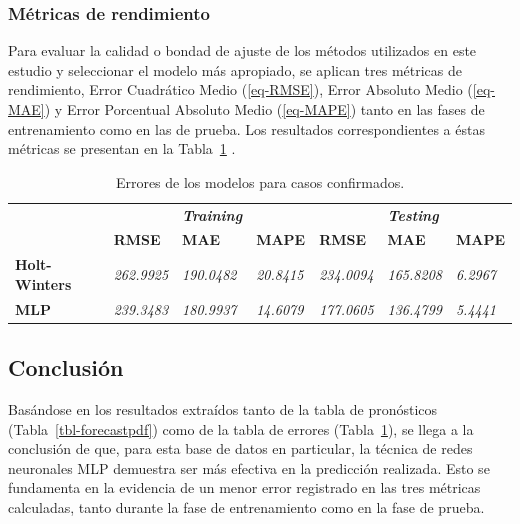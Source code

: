 \documentclass[
  us-letterpaper,
]{scrreprt}
\theoremstyle{plain}
\theoremstyle{definition}
\theoremstyle{definition}
\theoremstyle{plain}
\theoremstyle{remark}
\begin{document}
\subsubsection{Métricas de
rendimiento}\label{muxe9tricas-de-rendimiento}

Para evaluar la calidad o bondad de ajuste de los métodos utilizados en
este estudio y seleccionar el modelo más apropiado, se aplican tres
métricas de rendimiento, Error Cuadrático Medio (\ref{eq-RMSE}), Error
Absoluto Medio (\ref{eq-MAE}) y Error Porcentual Absoluto Medio
(\ref{eq-MAPE}) tanto en las fases de entrenamiento como en las de
prueba. Los resultados correspondientes a éstas métricas se presentan en
la Tabla~\ref{tbl-err} .

\begin{longtable}[]{@{}
  >{\raggedright\arraybackslash}p{}
  >{\centering\arraybackslash}p{}
  >{\centering\arraybackslash}p{}
  >{\centering\arraybackslash}p{}
  >{\centering\arraybackslash}p{}
  >{\centering\arraybackslash}p{}
  >{\centering\arraybackslash}p{}@{}}
\caption{Errores de los modelos para casos
confirmados.}\label{tbl-err}\tabularnewline
\toprule\noalign{}
\endfirsthead
\endhead
\bottomrule\noalign{}
\endlastfoot
& & \textbf{\emph{Training}} & & & \textbf{\emph{Testing}} & \\
& \textbf{RMSE} & \textbf{MAE} & \textbf{MAPE} & \textbf{RMSE} &
\textbf{MAE} & \textbf{MAPE} \\
\textbf{Holt-Winters} & \emph{262.9925} & \emph{190.0482} &
\emph{20.8415} & \emph{234.0094} & \emph{165.8208} & \emph{6.2967} \\
\textbf{MLP} & \emph{239.3483} & \emph{180.9937} & \emph{14.6079} &
\emph{177.0605} & \emph{136.4799} & \emph{5.4441} \\
\end{longtable}

\subsection{Conclusión}\label{conclusiuxf3n}

Basándose en los resultados extraídos tanto de la tabla de pronósticos
(Tabla~\ref{tbl-forecastpdf}) como de la tabla de errores
(Tabla~\ref{tbl-err}), se llega a la conclusión de que, para esta base
de datos en particular, la técnica de redes neuronales MLP demuestra ser
más efectiva en la predicción realizada. Esto se fundamenta en la
evidencia de un menor error registrado en las tres métricas calculadas,
tanto durante la fase de entrenamiento como en la fase de prueba.
\end{document}
